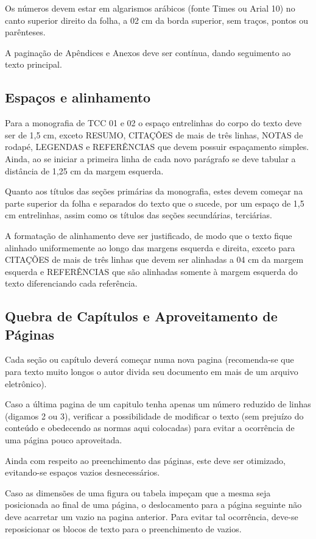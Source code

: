 Os números devem estar em algarismos arábicos (fonte Times ou Arial 10) no
canto superior direito da folha, a 02 cm da borda superior, sem traços, pontos
ou parênteses.

A paginação de Apêndices e Anexos deve ser contínua, dando seguimento ao texto
principal.

\subsection{Espaços e alinhamento}

Para a monografia de TCC 01 e 02 o espaço entrelinhas do corpo do texto deve
ser de 1,5 cm, exceto RESUMO, CITAÇÔES de mais de três linhas, NOTAS de rodapé,
LEGENDAS e REFERÊNCIAS que devem possuir espaçamento simples. Ainda, ao se
iniciar a primeira linha de cada novo parágrafo se deve tabular a distância de
1,25 cm da margem esquerda.

Quanto aos títulos das seções primárias da monografia, estes devem começar na
parte superior da folha e separados do texto que o sucede, por um espaço de 1,5
cm entrelinhas, assim como os títulos das seções secundárias, terciárias.

A formatação de alinhamento deve ser justificado, de modo que o texto fique
alinhado uniformemente ao longo das margens esquerda e direita, exceto para
CITAÇÕES de mais de três linhas que devem ser alinhadas a 04 cm da margem
esquerda e REFERÊNCIAS que são alinhadas somente à margem esquerda do texto
diferenciando cada referência.

\subsection{Quebra de Capítulos e Aproveitamento de Páginas}

Cada seção ou capítulo deverá começar numa nova pagina (recomenda-se que para
texto muito longos o autor divida seu documento em mais de um arquivo
eletrônico).

Caso a última pagina de um capitulo tenha apenas um número reduzido de linhas
(digamos 2 ou 3), verificar a possibilidade de modificar o texto (sem prejuízo
do conteúdo e obedecendo as normas aqui colocadas) para evitar a ocorrência de
uma página pouco aproveitada.

Ainda com respeito ao preenchimento das páginas, este deve ser otimizado,
evitando-se espaços vazios desnecessários.

Caso as dimensões de uma figura ou tabela impeçam que a mesma seja posicionada
ao final de uma página, o deslocamento para a página seguinte não deve
acarretar um vazio na pagina anterior. Para evitar tal ocorrência, deve-se
reposicionar os blocos de texto para o preenchimento de vazios.

